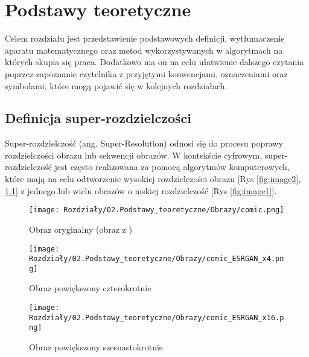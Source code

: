 \chapter{Podstawy teoretyczne} \label{chap:podstawy_teoretyczne}

Celem rozdziału jest przedstawienie podstawowych definicji, wytłumaczenie aparatu matematycznego oraz metod wykorzystywanych w algorytmach na których skupia się praca. Dodatkowo ma on na celu ułatwienie dalszego czytania poprzez zapoznanie czytelnika z przyjętymi konwencjami, oznaczeniami oraz symbolami, które mogą pojawić się w kolejnych rozdziałach. 


\section{Definicja super-rozdzielczości}

Super-rozdzielczość (ang. Super-Resolution) odnosi się do procesu poprawy rozdzielczości obrazu lub sekwencji obrazów. W kontekście cyfrowym, super-rozdzielczość jest często realizowana za pomocą algorytmów komputerowych, które mają na celu odtworzenie wysokiej rozdzielczości obrazu [Rys \ref{fig:image2}, \ref{fig:image3}] z jednego lub wielu obrazów o niskiej rozdzielczość [Rys \ref{fig:image1}].

\begin{figure}[ht]
    \centering
    \begin{minipage}[t]{0.3\linewidth}
        \texttt{[image: Rozdziały/02.Podstawy\_teoretyczne/Obrazy/comic.png]}
        \caption{Obraz oryginalny (obraz z \cite{zeyde2010single})}
        \label{fig:image1}
    \end{minipage}
    \hspace{0.5cm}
    \begin{minipage}[t]{0.3\linewidth}
        \texttt{[image: Rozdziały/02.Podstawy\_teoretyczne/Obrazy/comic\_ESRGAN\_x4.png]}
        \caption{Obraz powiększony czterokrotnie}
        \label{fig:image2}
    \end{minipage}
    \hspace{0.5cm}
    \begin{minipage}[t]{0.3\linewidth}
        \texttt{[image: Rozdziały/02.Podstawy\_teoretyczne/Obrazy/comic\_ESRGAN\_x16.png]}
        \caption{Obraz powiększony szesnastokrotnie}
        \label{fig:image3}
    \end{minipage}
\end{figure}

